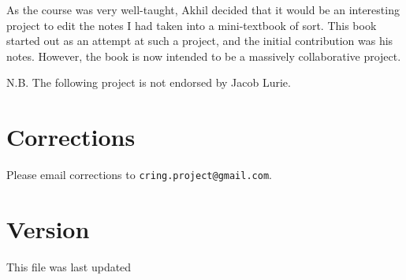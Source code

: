 As the course was very well-taught, Akhil decided that it would be an interesting project to 
edit the notes I had taken into a mini-textbook of sort. This book started out as an
attempt 
at such a project, and the initial contribution was his notes. However, the
book is now intended to be a massively collaborative
project.

N.B. The following project is not endorsed by Jacob Lurie.


\section*{Corrections}
Please email corrections to
\verb=cring.project@gmail.com=.

\section*{Version}
This file was last updated 


